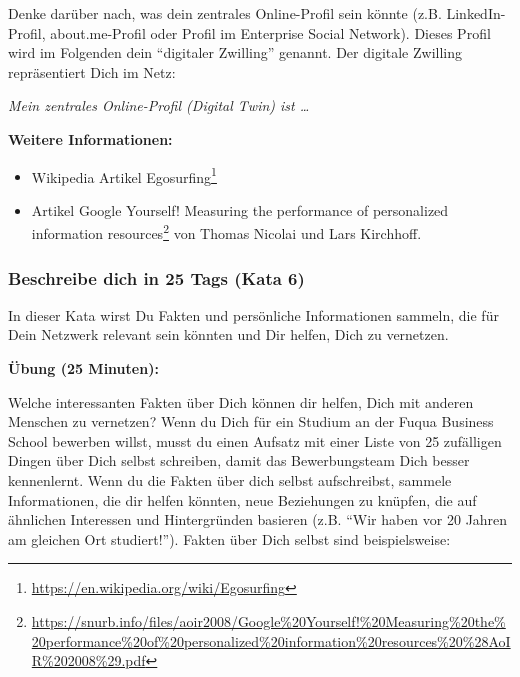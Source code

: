 \documentclass[
  ngerman,
  paper=a4,
,captions=tableheading
]{scrartcl}
\DeclareRobustCommand{\href}[2]{#2\footnote{\url{#1}}}
\providecommand{\tightlist}{%
  \setlength{\itemsep}{0pt}\setlength{\parskip}{0pt}}
\begin{document}
Denke darüber nach, was dein zentrales Online-Profil sein könnte (z.B.
LinkedIn-Profil, about.me-Profil oder Profil im Enterprise Social
Network). Dieses Profil wird im Folgenden dein ``digitaler Zwilling''
genannt. Der digitale Zwilling repräsentiert Dich im Netz:

\emph{Mein zentrales Online-Profil (Digital Twin) ist \ldots{}}

\textbf{Weitere Informationen:}

\begin{itemize}
\tightlist
\item
  Wikipedia Artikel
  \href{https://en.wikipedia.org/wiki/Egosurfing}{Egosurfing}
\item
  Artikel
  \href{https://snurb.info/files/aoir2008/Google\%20Yourself!\%20Measuring\%20the\%20performance\%20of\%20personalized\%20information\%20resources\%20\%28AoIR\%202008\%29.pdf}{Google
  Yourself! Measuring the performance of personalized information
  resources} von Thomas Nicolai und Lars Kirchhoff.
\end{itemize}

\hypertarget{beschreibe-dich-in-25-tags-kata-6}{%
\subsubsection{Beschreibe dich in 25 Tags (Kata
6)}\label{beschreibe-dich-in-25-tags-kata-6}}

In dieser Kata wirst Du Fakten und persönliche Informationen sammeln,
die für Dein Netzwerk relevant sein könnten und Dir helfen, Dich zu
vernetzen.

\textbf{Übung (25 Minuten):}

Welche interessanten Fakten über Dich können dir helfen, Dich mit
anderen Menschen zu vernetzen? Wenn du Dich für ein Studium an der Fuqua
Business School bewerben willst, musst du einen Aufsatz mit einer Liste
von 25 zufälligen Dingen über Dich selbst schreiben, damit das
Bewerbungsteam Dich besser kennenlernt. Wenn du die Fakten über dich
selbst aufschreibst, sammele Informationen, die dir helfen könnten, neue
Beziehungen zu knüpfen, die auf ähnlichen Interessen und Hintergründen
basieren (z.B. ``Wir haben vor 20 Jahren am gleichen Ort studiert!'').
Fakten über Dich selbst sind beispielsweise:
\end{document}
